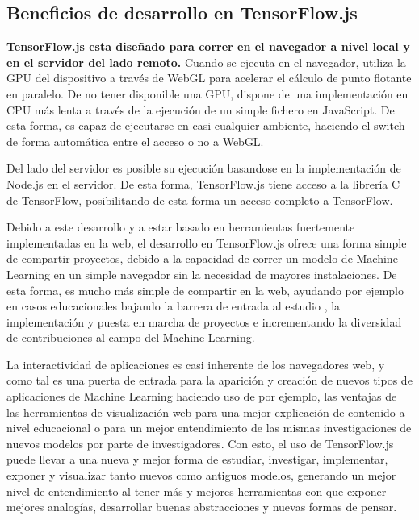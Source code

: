 
\subsection{Beneficios de desarrollo en TensorFlow.js}

\textbf{TensorFlow.js esta diseñado para correr en el navegador a nivel local y en el servidor del lado remoto.}
Cuando se ejecuta en el navegador, utiliza la GPU del dispositivo a través de WebGL para acelerar el cálculo de punto
flotante en paralelo. De no tener disponible una GPU, dispone de una implementación en CPU más lenta a través de la
ejecución de un simple fichero en JavaScript.
De esta forma, es capaz de ejecutarse en casi cualquier ambiente,
haciendo el switch de forma automática entre el acceso o no a WebGL.

Del lado del servidor es posible su ejecución basandose en la implementación de Node.js en el servidor. De esta forma,
TensorFlow.js tiene acceso a la librería C de TensorFlow, posibilitando de esta forma un acceso completo a TensorFlow.


Debido a este desarrollo y a estar basado en herramientas fuertemente implementadas en la web,
el desarrollo en TensorFlow.js ofrece una forma simple de compartir proyectos, debido a la capacidad de correr
un modelo de Machine Learning en un simple navegador sin la necesidad
de mayores instalaciones. De esta forma, es mucho más simple de compartir en la web, ayudando por ejemplo en casos
educacionales bajando la barrera de entrada al estudio \cite{kahngGANLabUnderstanding2018}, la implementación y
puesta en marcha de proyectos e
incrementando la diversidad de contribuciones al campo del Machine Learning.


La interactividad de aplicaciones es casi inherente de los navegadores web, y como tal es una puerta de entrada para
la aparición y creación de
nuevos tipos de aplicaciones de Machine Learning haciendo uso de por ejemplo, las ventajas de las herramientas de
visualización web para una mejor explicación de contenido a nivel educacional o para un mejor entendimiento de las
mismas investigaciones de nuevos modelos por parte de investigadores. Con esto, el uso de TensorFlow.js puede
llevar a una nueva y mejor forma de estudiar, investigar, implementar, exponer y visualizar tanto nuevos como
antiguos modelos, generando un mejor nivel de entendimiento al tener más y mejores herramientas con que exponer
 mejores analogías, desarrollar buenas abstracciones y nuevas formas de pensar.



